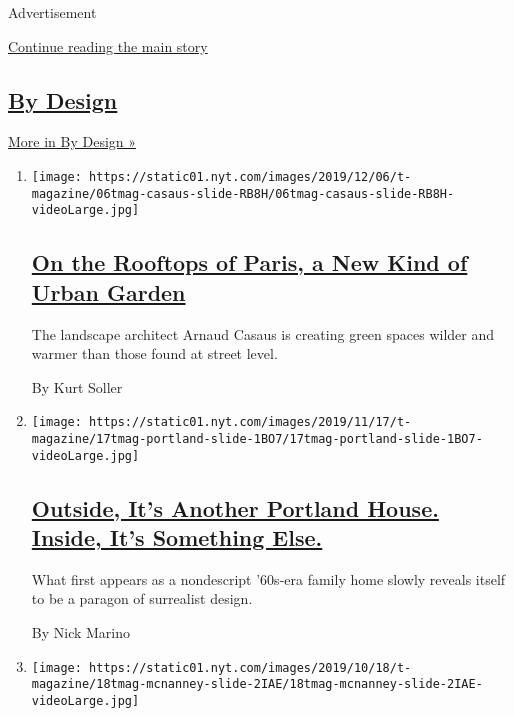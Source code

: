 Advertisement

\protect\hyperlink{after-mid1}{Continue reading the main story}

\hypertarget{by-design-1}{%
\subsection{\texorpdfstring{\href{/column/by-design}{By
Design}}{By Design}}\label{by-design-1}}

\href{/column/by-design}{More in By Design »}

\begin{enumerate}
\def\labelenumi{\arabic{enumi}.}
\item
  \texttt{[image: https://static01.nyt.com/images/2019/12/06/t-magazine/06tmag-casaus-slide-RB8H/06tmag-casaus-slide-RB8H-videoLarge.jpg]}

  \hypertarget{on-the-rooftops-of-paris-a-new-kind-of-urban-garden}{%
  \subsection{\texorpdfstring{\href{/2019/12/06/t-magazine/paris-rooftop-garden.html}{On
  the Rooftops of Paris, a New Kind of Urban
  Garden}}{On the Rooftops of Paris, a New Kind of Urban Garden}}\label{on-the-rooftops-of-paris-a-new-kind-of-urban-garden}}

  The landscape architect Arnaud Casaus is creating green spaces wilder
  and warmer than those found at street level.

  By Kurt Soller
\item
  \texttt{[image: https://static01.nyt.com/images/2019/11/17/t-magazine/17tmag-portland-slide-1BO7/17tmag-portland-slide-1BO7-videoLarge.jpg]}

  \hypertarget{outside-its-another-portland-house-inside-its-something-else}{%
  \subsection{\texorpdfstring{\href{/2019/11/05/t-magazine/portland-house-allie-furlotti-osmose-design.html}{Outside,
  It's Another Portland House. Inside, It's Something
  Else.}}{Outside, It's Another Portland House. Inside, It's Something Else.}}\label{outside-its-another-portland-house-inside-its-something-else}}

  What first appears as a nondescript '60s-era family home slowly
  reveals itself to be a paragon of surrealist design.

  By Nick Marino
\item
  \texttt{[image: https://static01.nyt.com/images/2019/10/18/t-magazine/18tmag-mcnanney-slide-2IAE/18tmag-mcnanney-slide-2IAE-videoLarge.jpg]}


\end{enumerate}
